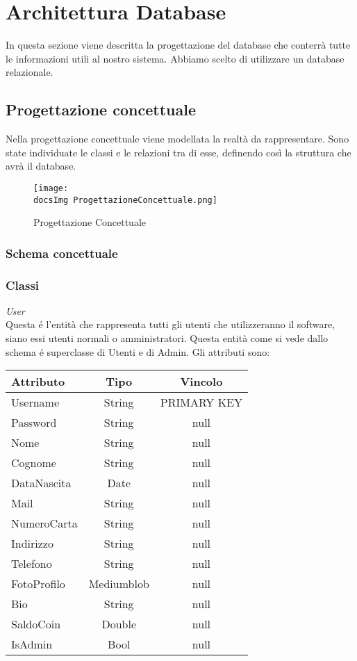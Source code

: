 \section{Architettura Database}{
	In questa sezione viene descritta la progettazione del database che conterrà tutte le informazioni utili al nostro sistema. Abbiamo scelto di utilizzare un database relazionale.
	
	\subsection{Progettazione concettuale}{
		Nella progettazione concettuale viene modellata la realtà da rappresentare. Sono state individuate le classi e le relazioni tra di esse, definendo così la struttura che avrà il database.
		
		\begin{figure}[ht]
				\texttt{[image: \\docsImg ProgettazioneConcettuale.png]}
				\caption{Progettazione Concettuale}
				\label{Fig. Progettazione Concettuale}
		\end{figure}
			
			\subsubsection{Schema concettuale}
			
			\subsubsection{Classi}
			\textit{User}\\
			Questa é l'entità che rappresenta tutti gli utenti che utilizzeranno il software, siano essi utenti normali o amministratori. Questa entità come si vede dallo schema é superclasse di Utenti e di Admin. Gli attributi sono: 
			\begin{center}
			\begin{tabular}{lcc}
				\textbf{Attributo}&\textbf{Tipo}&\textbf {Vincolo}\\
				\hline
				Username&String&PRIMARY KEY\\
				Password&String&null\\
				Nome&String&null \\
				Cognome&String&null \\
				DataNascita&Date&null\\
				Mail&String&null \\
				NumeroCarta&String&null \\
				Indirizzo&String&null \\
				Telefono&String&null \\
				FotoProfilo&Mediumblob&null\\
				Bio&String&null \\
				SaldoCoin&Double&null \\
				IsAdmin&Bool&null\\
			\end{tabular}
			\end{center}
		
}}
